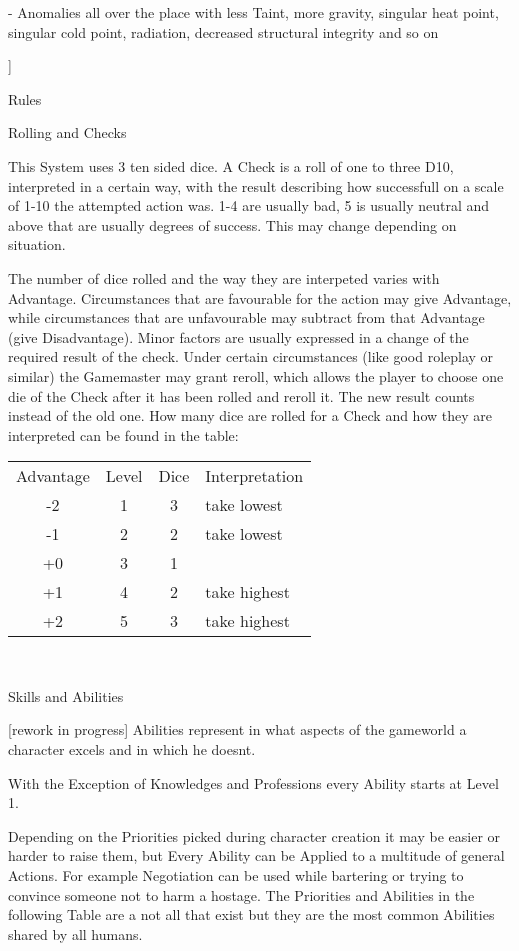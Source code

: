 \documentclass{article}
\newcommand{\headline}[1]{\begin{center}\Large #1 \normalsize \end{center}}
\newcommand{\subhline}[1]{\begin{center}\large #1 \normalsize \end{center}}
\begin{document}
    - Anomalies all over the place with less Taint, more gravity, singular heat point, singular cold point, radiation, decreased structural integrity and so on\par
    ]
    \newpage
    \headline{Rules}
    \subhline{Rolling and Checks}

    This System uses 3 ten sided dice. A Check is a roll of one to three D10, interpreted
    in a certain way, with the result describing how successfull on a scale of 1-10 the attempted action was.
    1-4 are usually bad, 5 is usually neutral and above that are usually degrees of success.
    This may change depending on situation. \par
    The number of dice rolled and the way they are interpeted varies with Advantage.
    Circumstances that are favourable for the action may give Advantage, while circumstances
    that are unfavourable may subtract from that Advantage (give Disadvantage).
    Minor factors are usually expressed in a change of the required result of the check. Under certain circumstances (like
    good roleplay or similar) the Gamemaster may grant reroll, which allows the player to choose one die of the Check after
    it has been rolled and reroll it. The new result counts instead of the old one. \newline\newline
    How many dice are rolled for a Check and how they are interpreted can be found in the table:\par

    \begin{tabular}{c|c|c|l}
        Advantage & Level & Dice & Interpretation \\
        -2& 1& 3& take lowest\\
        \hline
        -1& 2& 2& take lowest\\
        \hline
        +0& 3& 1&\\
        \hline
        +1& 4& 2& take highest\\
        \hline
        +2& 5& 3& take highest\\
    \end{tabular}\\

    \subhline{Skills and Abilities}
    [rework in progress]
    Abilities represent in what aspects of the gameworld a character excels and in which he doesnt.

    With the Exception of Knowledges and Professions every Ability starts at Level 1. \par
    Depending on the Priorities picked during character creation it may be easier or harder to raise them, but Every
    Ability can be Applied to a multitude of general Actions. For example Negotiation can be used while bartering or trying
    to convince someone not to harm a hostage. The Priorities and Abilities in the following Table are a not all that exist
    but they are the most common Abilities shared by all humans.\newline\newline
\end{document}
